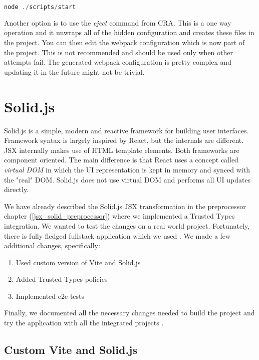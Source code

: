 \bigskip
\begin{lstlisting}[language=JavaScript, caption=Starting the CRA application]
node ./scripts/start
\end{lstlisting}

Another option is to use the \textit{eject} command from CRA. This is a one way operation and it
unwraps all of the hidden configuration and creates these files in the project. You can then edit
the webpack configuration which is now part of the project. This is not recommended and should be
used only when other attempts fail. The generated webpack configuration is pretty complex and
updating it in the future might not be trivial.

\section{Solid.js}
\label{section:solid}

Solid.js is a simple, modern and reactive framework for building user interfaces. Framework
syntax is largely inspired by React, but the internals are different. JSX internally makes use of
HTML template elements. Both frameworks are component oriented. The main difference is that React
uses a concept called \emph{virtual DOM} in which the UI representation is kept in memory and synced
with the "real" DOM. Solid.js does not use virtual DOM and performs all UI updates directly.

We have already described the Solid.js JSX transformation in the preprocessor chapter
(\ref{jsx_solid_preprocessor}) where we implemented a Trusted Types integration. We wanted to test
the changes on a real world project. Fortunately, there is fully fledged fullstack application which
we used \cite{original_solid_realworld_project}. We made a few additional changes, specifically:

\begin{enumerate}
  \item Used custom version of Vite and Solid.js
  \item Added Trusted Types policies
  \item Implemented e2e tests
\end{enumerate}

Finally, we documented all the necessary changes needed to build the project and try the application
with all the integrated projects \cite{solid_realworld_project:readme}.

\subsection{Custom Vite and Solid.js}

